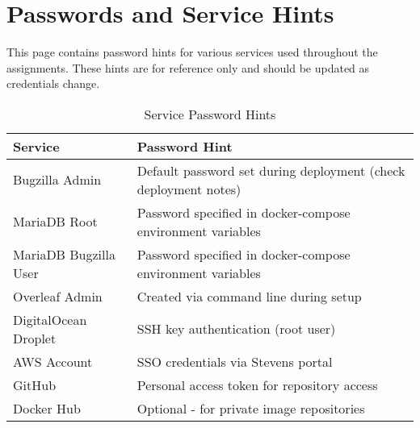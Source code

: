 \section*{Passwords and Service Hints}

This page contains password hints for various services used throughout the assignments. These hints are for reference only and should be updated as credentials change.

\vspace{1cm}

\begin{table}[h]
\centering
\begin{tabular}{|p{4cm}|p{9cm}|}
\hline
\textbf{Service} & \textbf{Password Hint} \\
\hline
Bugzilla Admin & Default password set during deployment (check deployment notes) \\
\hline
MariaDB Root & Password specified in docker-compose environment variables \\
\hline
MariaDB Bugzilla User & Password specified in docker-compose environment variables \\
\hline
Overleaf Admin & Created via command line during setup \\
\hline
DigitalOcean Droplet & SSH key authentication (root user) \\
\hline
AWS Account & SSO credentials via Stevens portal \\
\hline
GitHub & Personal access token for repository access \\
\hline
Docker Hub & Optional - for private image repositories \\
\hline
\end{tabular}
\caption{Service Password Hints}
\label{tab:passwords}
\end{table}

\vspace{1cm}